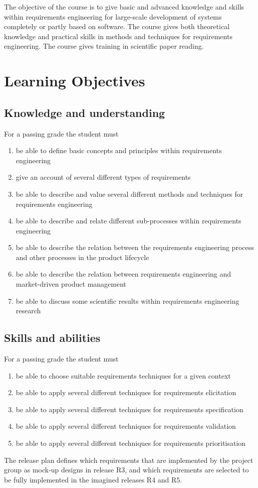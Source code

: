 \maketitle
\noindent 
The objective of the course is to give basic and advanced knowledge and skills within requirements engineering for large-scale development of systems completely or partly based on software. The course gives both theoretical knowledge and practical skills in methods and techniques for requirements engineering. The course gives training in scientific paper reading.

\section{Learning Objectives}
\subsection{Knowledge and understanding}
For a passing grade the student must
\begin{enumerate}[noitemsep]
\item be able to define basic concepts and principles within requirements engineering 
\item give an account of several different types of requirements
\item be able to describe and value several different methods and techniques for requirements engineering
\item be able to describe and relate different sub-processes within requirements engineering
\item be able to describe the relation between the requirements engineering process and other processes in the product lifecycle
\ifteknolog
	\item be able to describe the relation between requirements engineering and market-driven product management
	\item be able to discuss some scientific results within requirements engineering research
\fi
\end{enumerate}


\subsection{Skills and abilities}
For a passing grade the student must
\begin{enumerate}[noitemsep]
\item be able to choose suitable requirements techniques for a given context
\item     be able to apply several different techniques for requirements elicitation
\item     be able to apply several different techniques for requirements specification
\item     be able to apply several different techniques for requirements validation
\item     be able to apply several different techniques for requirements prioritisation
\end{enumerate}
\ifteknolog
  The release plan defines which requirements that are implemented by the project group as mock-up designs in release R3, and which requirements are selected to be fully implemented in the imagined releases R4 and R5. 
 \fi
